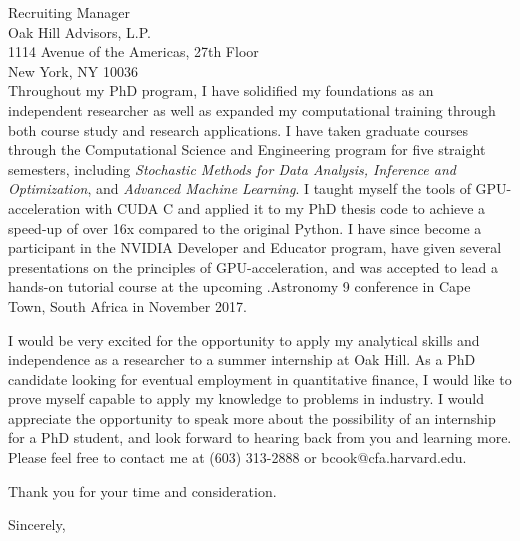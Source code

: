 \documentclass{letter}
\begin{document}
\begin{letter}{Recruiting Manager\\
Oak Hill Advisors, L.P.\\
1114 Avenue of the Americas, 27th Floor\\
New York, NY 10036\\
}
\noindent Throughout my PhD program, I have solidified my foundations
as an independent researcher as well as expanded my computational
training through both course study and research applications. I have
taken graduate courses through the Computational Science and
Engineering program for five straight semesters, including
\textit{Stochastic Methods for Data Analysis, Inference and
  Optimization}, and \textit{Advanced Machine Learning}. I taught
myself the tools of GPU-acceleration with CUDA C and applied it to my
PhD thesis code to achieve a speed-up of over 16x compared to the
original Python. I have since become a participant in the NVIDIA
Developer and Educator program, have given several presentations on
the principles of GPU-acceleration, and was accepted to lead a
hands-on tutorial course at the upcoming .Astronomy 9 conference in
Cape Town, South Africa in November 2017.

\noindent I would be very excited for the opportunity to apply my
analytical skills and independence as a researcher to a summer
internship at Oak Hill. As a PhD candidate looking for eventual
employment in quantitative finance, I would like to prove myself
capable to apply my knowledge to problems in industry. I would
appreciate the opportunity to speak more about the possibility of an
internship for a PhD student, and look forward to hearing back from
you and learning more. Please feel free to contact me at (603)
313-2888 or bcook@cfa.harvard.edu.

Thank you for your time and consideration.


\closing{Sincerely,}


\end{letter}
\end{document}
